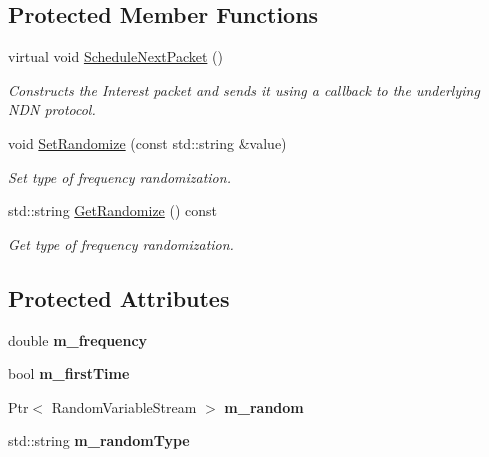 \subsection*{Protected Member Functions}
\begin{DoxyCompactItemize}
\item 
virtual void \hyperlink{classns3_1_1ndn_1_1ConsumerCbr_ab64b723e571debefced5abe3bd492080}{Schedule\+Next\+Packet} ()\hypertarget{classns3_1_1ndn_1_1ConsumerCbr_ab64b723e571debefced5abe3bd492080}{}\label{classns3_1_1ndn_1_1ConsumerCbr_ab64b723e571debefced5abe3bd492080}

\begin{DoxyCompactList}\small\item\em Constructs the Interest packet and sends it using a callback to the underlying N\+DN protocol. \end{DoxyCompactList}\item 
void \hyperlink{classns3_1_1ndn_1_1ConsumerCbr_a437caf4ce25094b75e2c9103d9882e8a}{Set\+Randomize} (const std\+::string \&value)
\begin{DoxyCompactList}\small\item\em Set type of frequency randomization. \end{DoxyCompactList}\item 
std\+::string \hyperlink{classns3_1_1ndn_1_1ConsumerCbr_ab43fafc85b3c4f616700a16011e27908}{Get\+Randomize} () const
\begin{DoxyCompactList}\small\item\em Get type of frequency randomization. \end{DoxyCompactList}\end{DoxyCompactItemize}
\subsection*{Protected Attributes}
\begin{DoxyCompactItemize}
\item 
double {\bfseries m\+\_\+frequency}\hypertarget{classns3_1_1ndn_1_1ConsumerCbr_a17d275f737c43be48a0a1e19ae393890}{}\label{classns3_1_1ndn_1_1ConsumerCbr_a17d275f737c43be48a0a1e19ae393890}

\item 
bool {\bfseries m\+\_\+first\+Time}\hypertarget{classns3_1_1ndn_1_1ConsumerCbr_a814639309e9e302ec0d3e00c123019bf}{}\label{classns3_1_1ndn_1_1ConsumerCbr_a814639309e9e302ec0d3e00c123019bf}

\item 
Ptr$<$ Random\+Variable\+Stream $>$ {\bfseries m\+\_\+random}\hypertarget{classns3_1_1ndn_1_1ConsumerCbr_a870c87e088646858f209fc07a80ad968}{}\label{classns3_1_1ndn_1_1ConsumerCbr_a870c87e088646858f209fc07a80ad968}

\item 
std\+::string {\bfseries m\+\_\+random\+Type}\hypertarget{classns3_1_1ndn_1_1ConsumerCbr_ab52fb6a1d6b6114a8e5feae9ca5764e9}{}\label{classns3_1_1ndn_1_1ConsumerCbr_ab52fb6a1d6b6114a8e5feae9ca5764e9}

\end{DoxyCompactItemize}
